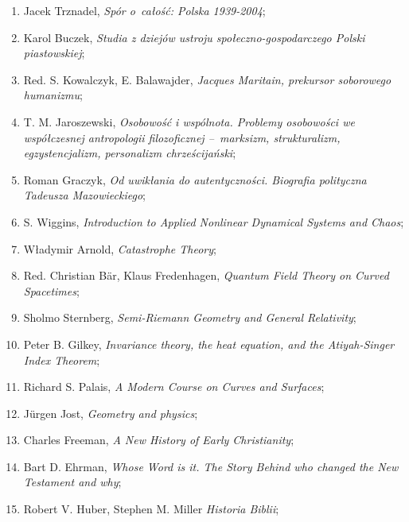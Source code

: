 \documentclass[a4paper,11pt]{article}
\begin{document}
\begin{enumerate}
\item Jacek Trznadel, \textit{Spór o~całość: Polska 1939-2004};

\item Karol Buczek, \textit{Studia z dziejów ustroju
    społeczno-gospodarczego Polski piastowskiej};

\item Red. S. Kowalczyk, E. Balawajder, \textit{Jacques Maritain,
    prekursor soborowego humanizmu};

\item T. M. Jaroszewski, \textit{Osobowość i wspólnota. Problemy
    osobowości we współczesnej antropologii filozoficznej --~marksizm,
    strukturalizm, egzystencjalizm, personalizm chrześcijański};

\item Roman Graczyk, \textit{Od uwikłania do autentyczności. Biografia
    polityczna Tadeusza Mazowieckiego};

\item S. Wiggins, \textit{Introduction to Applied Nonlinear Dynamical
    Systems and Chaos};

\item Władymir Arnold, \textit{Catastrophe Theory};

\item Red. Christian B\"{a}r, Klaus Fredenhagen, \textit{Quantum Field
    Theory on Curved Spacetimes};

\item Sholmo Sternberg, \textit{Semi-Riemann Geometry and General
    Relativity};

\item Peter B. Gilkey, \textit{Invariance theory, the heat equation, and
    the Atiyah-Singer Index Theorem};

\item Richard S. Palais, \textit{A Modern Course on Curves and
    Surfaces};

\item J\"{u}rgen Jost, \textit{Geometry and physics};

\item Charles Freeman, \textit{A New History of Early Christianity};

\item Bart D. Ehrman, \textit{Whose Word is it. The Story Behind who
    changed the New Testament and why};

\item Robert V. Huber, Stephen M. Miller \textit{Historia Biblii};


\end{enumerate}
\end{document}
